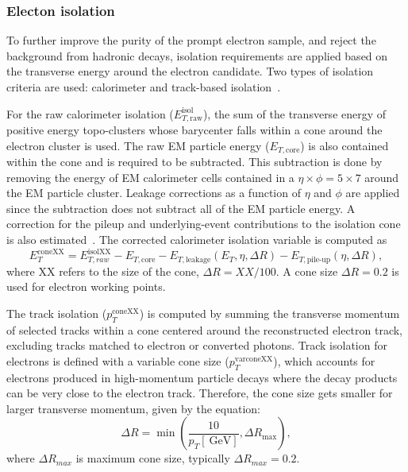 \subsubsection{Electon isolation}
To further improve the purity of the prompt electron sample, and reject the background from hadronic decays, isolation requirements are applied based on the transverse energy around the electron candidate. Two types of isolation criteria are used: calorimeter and track-based isolation~\cite{Aad:2019tso}.

For the raw calorimeter isolation ($E_{T,\mathrm{raw}}^{\mathrm{isol}}$), the sum of the transverse energy of positive energy topo-clusters whose barycenter falls within a cone around the electron cluster is used. The raw EM particle energy ($E_{T,\mathrm{core}}$) is also contained within the cone and is required to be subtracted. This subtraction is done by removing the energy of EM calorimeter cells contained in a $\eta \times \phi = 5 \times 7$ around the EM particle cluster. Leakage corrections as a function of $\eta$ and $\phi$ are applied since the subtraction does not subtract all of the EM particle energy. A correction for the pileup and underlying-event contributions to the isolation cone is also estimated~\cite{Cacciari:2007fd}. The corrected calorimeter isolation variable is computed as
\begin{equation}
    E_{T}^{\mathrm{coneXX}} = E_{T,raw}^{\mathrm{isolXX}} - E_{T,\mathrm{core}} - E_{T,\mathrm{leakage}}(E_T,\eta,\Delta R) - E_{{T,\textrm{pile-up}}}(\eta,\Delta R),
\end{equation}
where XX refers to the size of the cone, $\Delta R = XX/100$. A cone size $\Delta R = 0.2$ is used for electron working points.  

The track isolation ($p_{T}^{\mathrm{coneXX}}$) is computed by summing the transverse momentum of selected tracks within a cone centered around the reconstructed electron track, excluding tracks matched to electron or converted photons. Track isolation for electrons is defined with a variable cone size ($p_{T}^{\mathrm{varconeXX}}$), which accounts for electrons produced in high-momentum particle decays where the decay products can be very close to the electron track. Therefore, the cone size gets smaller for larger transverse momentum, given by the equation: 
\begin{equation}
    \Delta R = \min \left( \frac{10}{p_T[\SI{}{\giga\electronvolt}]}, \Delta R_{\mathrm{max}}\right),
\end{equation}
where $\Delta R_{max}$ is maximum cone size, typically $\Delta R_{max} = 0.2$. 

